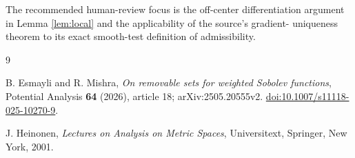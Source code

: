 \documentclass[11pt]{article}
\begin{document}
The recommended human-review focus is the off-center differentiation argument
in Lemma \ref{lem:local} and the applicability of the source's gradient-
uniqueness theorem to its exact smooth-test definition of admissibility.

\begin{thebibliography}{9}

B. Esmayli and R. Mishra,
\emph{On removable sets for weighted Sobolev functions},
Potential Analysis \textbf{64} (2026), article 18;
arXiv:2505.20555v2.
\href{https://doi.org/10.1007/s11118-025-10270-9}
{doi:10.1007/s11118-025-10270-9}.

J. Heinonen,
\emph{Lectures on Analysis on Metric Spaces},
Universitext, Springer, New York, 2001.

\end{thebibliography}
\end{document}
